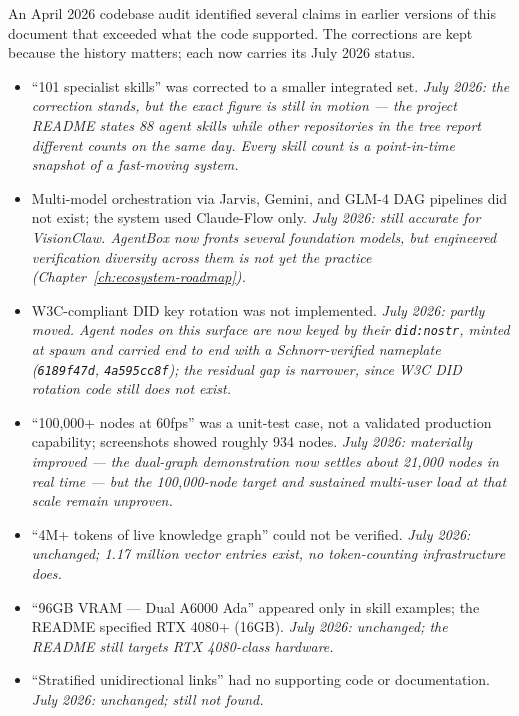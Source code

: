 \begin{cautionbox}[title={Corrected Claims, with Their July 2026 Status}]
An April 2026 codebase audit identified several claims in earlier versions of this document that exceeded what the code supported. The corrections are kept because the history matters; each now carries its July 2026 status.
\begin{itemize}
  \item ``101 specialist skills'' was corrected to a smaller integrated set. \emph{July 2026: the correction stands, but the exact figure is still in motion --- the project README states 88 agent skills while other repositories in the tree report different counts on the same day. Every skill count is a point-in-time snapshot of a fast-moving system.}
  \item Multi-model orchestration via Jarvis, Gemini, and GLM-4 DAG pipelines did not exist; the system used Claude-Flow only. \emph{July 2026: still accurate for VisionClaw. AgentBox now fronts several foundation models, but engineered verification diversity across them is not yet the practice (Chapter~\ref{ch:ecosystem-roadmap}).}
  \item W3C-compliant DID key rotation was not implemented. \emph{July 2026: partly moved. Agent nodes on this surface are now keyed by their \texttt{did:nostr}, minted at spawn and carried end to end with a Schnorr-verified nameplate (\texttt{6189f47d}, \texttt{4a595cc8f}); the residual gap is narrower, since W3C DID \emph{rotation} code still does not exist.}
  \item ``100,000+ nodes at 60fps'' was a unit-test case, not a validated production capability; screenshots showed roughly 934 nodes. \emph{July 2026: materially improved --- the dual-graph demonstration now settles about 21,000 nodes in real time --- but the 100,000-node target and sustained multi-user load at that scale remain unproven.}
  \item ``4M+ tokens of live knowledge graph'' could not be verified. \emph{July 2026: unchanged; 1.17 million vector entries exist, no token-counting infrastructure does.}
  \item ``96GB VRAM --- Dual A6000 Ada'' appeared only in skill examples; the README specified RTX 4080+ (16GB). \emph{July 2026: unchanged; the README still targets RTX 4080-class hardware.}
  \item ``Stratified unidirectional links'' had no supporting code or documentation. \emph{July 2026: unchanged; still not found.}
\end{itemize}
\end{cautionbox}

